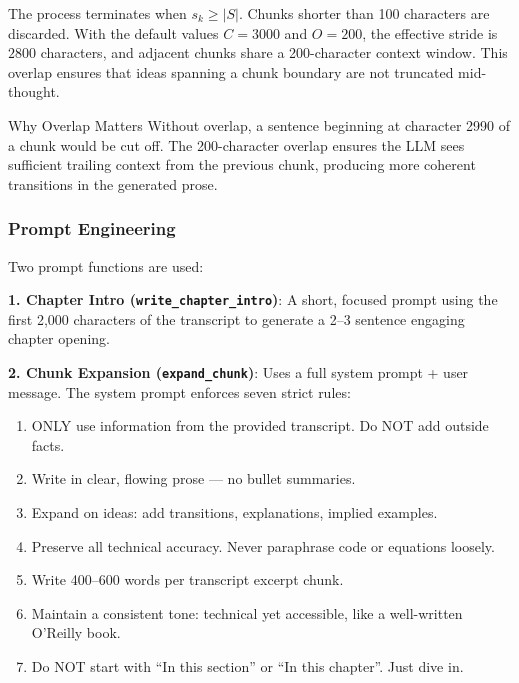 \documentclass[11pt,a4paper]{article}
\begin{document}
The process terminates when $s_k \geq |S|$. Chunks shorter than 100 characters are discarded. With the default values $C = 3000$ and $O = 200$, the effective stride is $2800$ characters, and adjacent chunks share a 200-character context window. This overlap ensures that ideas spanning a chunk boundary are not truncated mid-thought.

\begin{designbox}{Why Overlap Matters}
Without overlap, a sentence beginning at character 2990 of a chunk would be cut off. The 200-character overlap ensures the LLM sees sufficient trailing context from the previous chunk, producing more coherent transitions in the generated prose.
\end{designbox}

\subsubsection{Prompt Engineering}

Two prompt functions are used:

\textbf{1. Chapter Intro (\texttt{write\_chapter\_intro})}: A short, focused prompt using the first 2,000 characters of the transcript to generate a 2--3 sentence engaging chapter opening.

\textbf{2. Chunk Expansion (\texttt{expand\_chunk})}: Uses a full system prompt + user message. The system prompt enforces seven strict rules:

\begin{tcolorbox}[colback=CodeBG, colframe=DarkBlue, title=\textbf{System Prompt Rules (verbatim)}]
\footnotesize
\begin{enumerate}
    \item ONLY use information from the provided transcript. Do NOT add outside facts.
    \item Write in clear, flowing prose --- no bullet summaries.
    \item Expand on ideas: add transitions, explanations, implied examples.
    \item Preserve all technical accuracy. Never paraphrase code or equations loosely.
    \item Write 400--600 words per transcript excerpt chunk.
    \item Maintain a consistent tone: technical yet accessible, like a well-written O'Reilly book.
    \item Do NOT start with ``In this section'' or ``In this chapter''. Just dive in.
\end{enumerate}
\end{tcolorbox}
\end{document}

